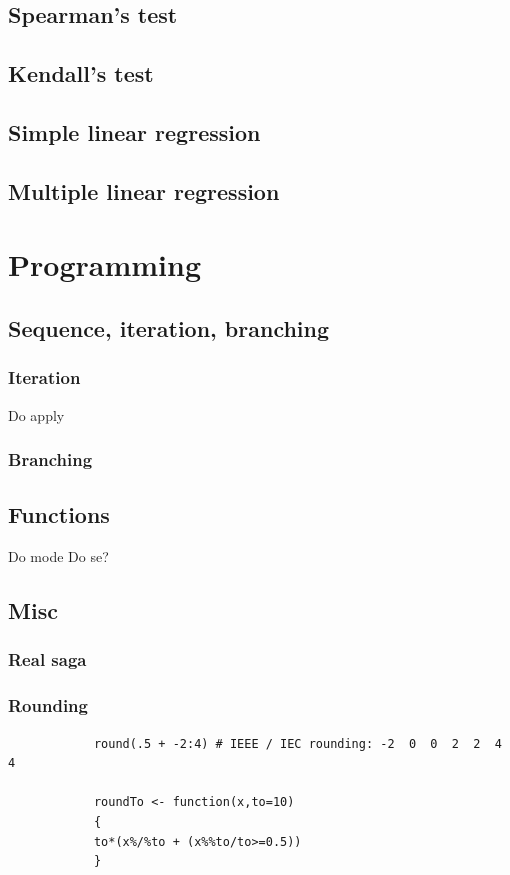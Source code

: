\documentclass{report}
\begin{document}
	\section{Spearman’s test}
	\section{Kendall’s test}
	\section{Simple linear regression}
	\section{Multiple linear regression}

\chapter{Programming}
	\section{Sequence, iteration, branching}
		\subsection{Iteration}\label{subsec:iteration}
		Do apply
		
		\subsection{Branching}\label{subsec:branching}
	\section{Functions}\label{sec:functions}
	Do mode
	Do se?
	
	\section{Misc}
		\subsection{Real saga}
		\subsection{Rounding}
		
		\begin{verbatim}
			round(.5 + -2:4) # IEEE / IEC rounding: -2  0  0  2  2  4  4
			
			roundTo <- function(x,to=10)
			{
			to*(x%/%to + (x%%to/to>=0.5))
			}
		\end{verbatim}
		
\end{document}
